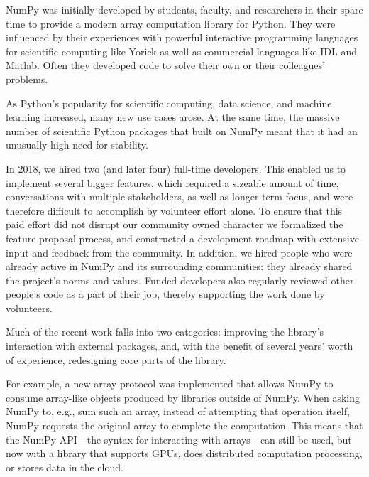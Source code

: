 
NumPy was initially developed by students, faculty, and researchers in their
spare time to provide a modern array computation library for Python.
They were influenced by their experiences with powerful interactive programming
languages for scientific computing like Yorick \cite{munro1995using} as well
as commercial languages like IDL and Matlab.
Often they developed code to solve their own or their colleagues' problems.

As Python's popularity for scientific computing, data science, and machine
learning increased, many new use cases arose.
At the same time, the massive number of scientific Python packages that
built on NumPy meant that it had an unusually high need for stability.

In 2018, we hired two (and later four) full-time developers.
This enabled us to implement several bigger features,
which required a sizeable amount of time, conversations with multiple
stakeholders, as well as longer term focus, and were therefore difficult to
accomplish by volunteer effort alone.
To ensure that this paid effort did not disrupt our community owned character
we formalized the feature proposal process, and constructed a development
roadmap with extensive input and feedback from the community.   In addition,
we hired people who were already active in NumPy and its surrounding communities:
they already shared the project's norms and values.
Funded developers also regularly reviewed other people's code as a part of
their job, thereby supporting the work done by volunteers.

Much of the recent work falls into two categories: improving the library's
interaction with external packages, and, with the benefit of several years'
worth of experience, redesigning core parts of the library.

For example, a new array protocol was implemented that allows NumPy to consume
array-like objects produced by libraries outside of NumPy.  When asking NumPy
to, e.g., sum such an array, instead of attempting that operation itself, NumPy
requests the original array to complete the computation.  This means that the
NumPy API---the syntax for interacting with arrays---can still be used, but now
with a library that supports GPUs, does distributed computation processing, or
stores data in the cloud.

